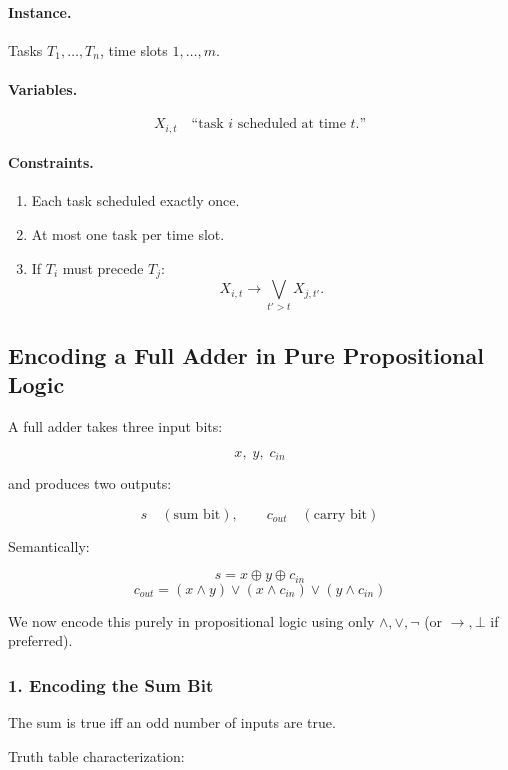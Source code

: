 \documentclass{article}
\begin{document}
\paragraph{Instance.}
Tasks $T_1,\dots,T_n$, time slots $1,\dots,m$.

\paragraph{Variables.}
\[
X_{i,t} \quad \text{``task $i$ scheduled at time $t$.''}
\]

\paragraph{Constraints.}

\begin{enumerate}
    \item Each task scheduled exactly once.
    \item At most one task per time slot.
    \item If $T_i$ must precede $T_j$:
    \[
    X_{i,t} \rightarrow
    \bigvee_{t' > t} X_{j,t'}.
    \]
\end{enumerate}

\bigskip
\subsection{Encoding a Full Adder in Pure Propositional Logic}

A full adder takes three input bits:

\[
x,\; y,\; c_{in}
\]

and produces two outputs:

\[
s \quad (\text{sum bit}), \qquad c_{out} \quad (\text{carry bit})
\]

Semantically:

\[
s = x \oplus y \oplus c_{in}
\]
\[
c_{out} = (x \land y) \lor (x \land c_{in}) \lor (y \land c_{in})
\]

We now encode this purely in propositional logic using only
$\land,\lor,\neg$ (or $\to,\bot$ if preferred).

\bigskip
\subsubsection*{1. Encoding the Sum Bit}

The sum is true iff an odd number of inputs are true.

Truth table characterization:
\end{document}
